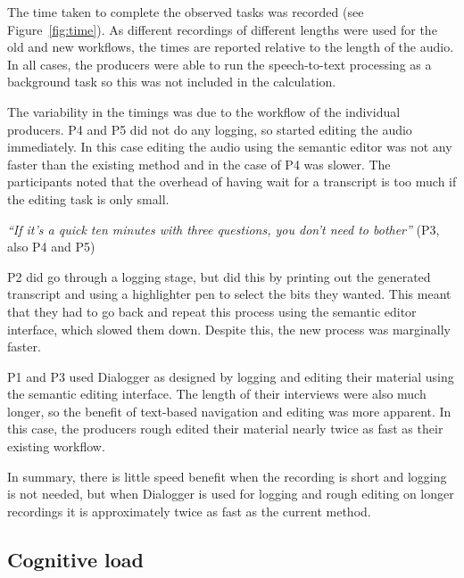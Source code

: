 The time taken to complete the observed tasks was recorded (see Figure~\ref{fig:time}). As different recordings of
different lengths were used for the old and new workflows, the times are reported relative to the length of the audio.
In all cases, the producers were able to run the speech-to-text processing as a background task so this was not
included in the calculation.

The variability in the timings was due to the workflow of the individual producers. P4 and P5 did not do any logging,
so started editing the audio immediately. In this case editing the audio using the semantic editor was not any faster
than the existing method and in the case of P4 was slower.  The participants noted that the overhead of having wait for
a transcript is too much if the editing task is only small.

\textit{``If it's a quick ten minutes with three questions, you don't need to bother''} (P3, also P4 and P5)

P2 did go through a logging stage, but did this by printing out the generated transcript and using a highlighter pen to
select the bits they wanted. This meant that they had to go back and repeat this process using the semantic editor
interface, which slowed them down. Despite this, the new process was marginally faster.

P1 and P3 used Dialogger as designed by logging and editing their material using the semantic editing interface. The
length of their interviews were also much longer, so the benefit of text-based navigation and editing was more
apparent. In this case, the producers rough edited their material nearly twice as fast as their existing workflow.

In summary, there is little speed benefit when the recording is short and logging is not needed, but when Dialogger is
used for logging and rough editing on longer recordings it is approximately twice as fast as the current method.

\subsection{Cognitive load}


